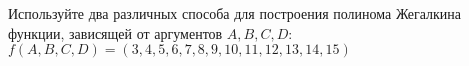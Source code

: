 \question Используйте два различных способа для построения полинома Жегалкина функции, зависящей от аргументов $A, B, C, D$:
$f(A,B,C,D) = (3,4,5,6,7,8,9,10,11,12,13,14,15)$